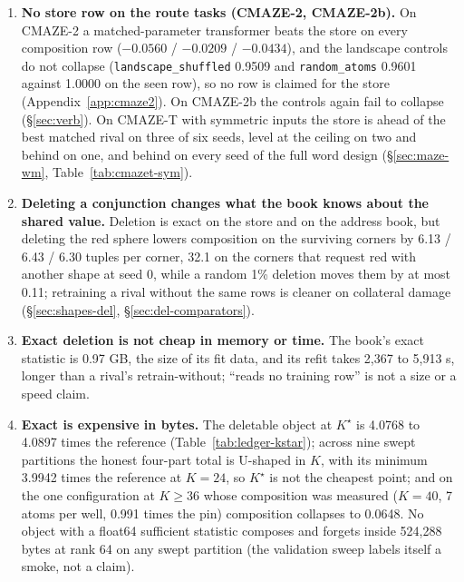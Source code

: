 \documentclass{article} %
\newcommand{\Kstar}{\ensuremath{K^{\star}}}
\begin{document}
\begin{enumerate}[leftmargin=*,itemsep=1pt]
\item \textbf{No store row on the route tasks (CMAZE-2, CMAZE-2b).} On CMAZE-2 a matched-parameter transformer beats the
  store on every composition row ($-0.0560$ / $-0.0209$ / $-0.0434$), and the landscape controls do
  not collapse (\texttt{landscape\_shuffled} 0.9509 and \texttt{random\_atoms} 0.9601 against
  1.0000 on the seen row), so no row is claimed for the store (Appendix~\ref{app:cmaze2}). On
  CMAZE-2b the controls again fail to collapse (\S\ref{sec:verb}). %
  On CMAZE-T with symmetric inputs the store is ahead of the best matched rival on three of six seeds,
  level at the ceiling on two and behind on one, and behind on every seed of the full word design %
  (\S\ref{sec:maze-wm}, Table~\ref{tab:cmazet-sym}).
\item \textbf{Deleting a conjunction changes what the book knows about the shared value.} Deletion
  is exact on the store and on the address book, but deleting the red sphere lowers composition on
  the surviving corners by 6.13 / 6.43 / 6.30 tuples per corner, 32.1 on the corners that request red %
  with another shape at seed 0, while a random 1\% deletion moves them by at most 0.11; retraining a %
  rival without the same rows is cleaner on collateral damage (\S\ref{sec:shapes-del},
  \S\ref{sec:del-comparators}).
\item \textbf{Exact deletion is not cheap in memory or time.} The book's exact statistic is 0.97 GB, %
  the size of its fit data, and its refit takes 2,367 to 5,913 s, longer than a rival's %
  retrain-without; ``reads no training row'' is not a size or a speed claim.
\item \textbf{Exact is expensive in bytes.} The deletable object at $\Kstar$ is 4.0768 to 4.0897
  times the reference (Table~\ref{tab:ledger-kstar}); across nine swept partitions the honest
  four-part total is U-shaped in $K$, with its minimum 3.9942 times the reference at $K=24$, so
  $\Kstar$ is not the cheapest point; and on the one configuration at $K\ge36$ whose composition
  was measured ($K=40$, 7 atoms per well, 0.991 times the pin) composition collapses to 0.0648.
  No object with a float64 sufficient statistic composes and forgets inside 524,288 bytes at rank
  64 on any swept partition (the validation sweep labels itself a smoke, not a claim).

\end{enumerate}
\end{document}
